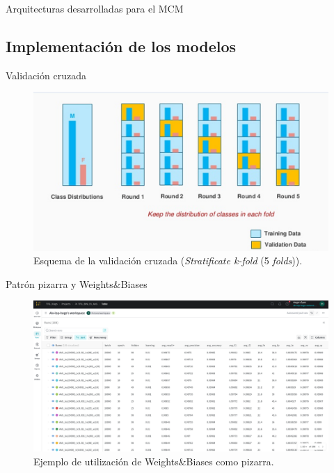 \begin{frame}{Arquitecturas desarrolladas para el MCM}
\end{frame}


\subsection{Implementación de los modelos}
\begin{frame}{Validación cruzada}

	\begin{figure}
		\centering
	    \includegraphics[width=\linewidth]{./img/stratifiedkfolds.png}
    		\caption{Esquema de la validación cruzada (\textit{Stratificate k-fold} (5 \textit{folds})).}
	\end{figure}

\end{frame}




\begin{frame}{Patrón pizarra y Weights\&Biases}
	\begin{figure}
		\centering
	    \includegraphics[width=\linewidth]{./img/wandb.png}
    		\caption{Ejemplo de utilización de Weights\&Biases como pizarra.}
	\end{figure}
\end{frame}



